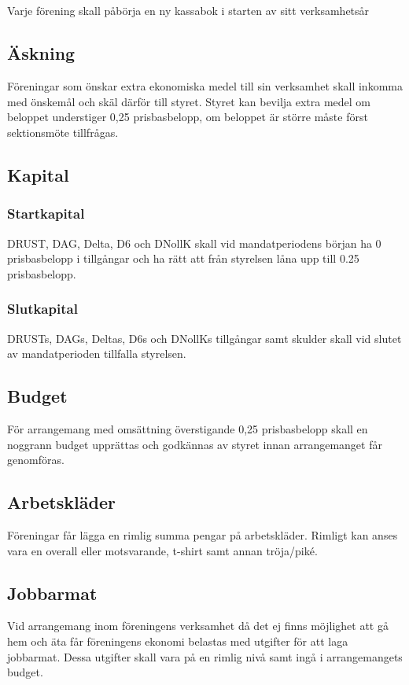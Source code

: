 \documentclass{dtek}
\begin{document}
\subsection{}
Varje förening skall påbörja en ny kassabok i starten av sitt verksamhetsår
\subsection{Äskning}
Föreningar som önskar extra ekonomiska medel till sin verksamhet skall inkomma med önskemål och skäl därför till styret. Styret kan bevilja extra medel om beloppet understiger 0,25 prisbasbelopp, om beloppet är större måste först sektionsmöte tillfrågas.
\subsection{Kapital}
\label{sec:sektionsforeningar_startkapital}
\subsubsection{Startkapital}
DRUST, DAG, Delta, D6 och DNollK skall vid mandatperiodens början ha 0 prisbasbelopp i tillgångar och ha rätt att från styrelsen låna upp till 0.25 prisbasbelopp.
\subsubsection{Slutkapital}
DRUSTs, DAGs, Deltas, D6s och DNollKs tillgångar samt skulder skall vid slutet av mandatperioden tillfalla styrelsen.
\subsection{Budget}
För arrangemang med omsättning överstigande 0,25 prisbasbelopp skall en noggrann budget upprättas och godkännas av styret innan arrangemanget får genomföras.
\subsection{Arbetskläder}
Föreningar får lägga en rimlig summa pengar på arbetskläder. Rimligt kan anses vara en overall eller motsvarande, t-shirt samt annan tröja/piké.
\subsection{Jobbarmat}
Vid arrangemang inom föreningens verksamhet då det ej finns möjlighet att gå hem och äta får föreningens ekonomi belastas med utgifter för att laga jobbarmat. Dessa utgifter skall vara på en rimlig nivå samt ingå i arrangemangets budget.
\end{document}
